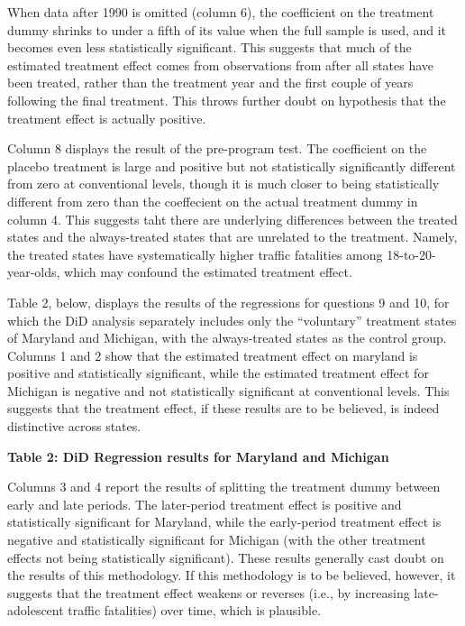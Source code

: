 \documentclass{article}
\begin{document}
When data after 1990 is omitted (column 6), the coefficient on the treatment dummy shrinks to under a fifth of its value when the full sample is used, and it becomes even less statistically significant. This suggests that much of the estimated treatment effect comes from observations from after all states have been treated, rather than the treatment year and the first couple of years following the final treatment. This throws further doubt on hypothesis that the treatment effect is actually positive. 

Column 8 displays the result of the pre-program test. The coefficient on the placebo treatment is large and positive but not statistically significantly different from zero at conventional levels, though it is much closer to being statistically different from zero than the coeffecient on the actual treatment dummy in column 4. This suggests taht there are underlying differences between the treated states and the always-treated states that are unrelated to the treatment. Namely, the treated states have systematically higher traffic fatalities among 18-to-20-year-olds, which may confound the estimated treatment effect. 

Table 2, below, displays the results of the regressions for questions 9 and 10, for which the DiD analysis separately includes only the ``voluntary'' treatment states of Maryland and Michigan, with the always-treated states as the control group. Columns 1 and 2 show that the estimated treatment effect on maryland is positive and statistically significant, while the estimated treatment effect for Michigan is negative and not statistically significant at conventional levels. This suggests that the treatment effect, if these results are to be believed, is indeed distinctive across states.

\pagebreak
\begin{center}
        \textbf{Table 2: DiD Regression results for Maryland and Michigan}
        
\end{center}
\noindent Columns 3 and 4 report the results of splitting the treatment dummy between early and late periods. The later-period treatment effect is positive and statistically significant for Maryland, while the early-period treatment effect is negative and statistically significant for Michigan (with the other treatment effects not being statistically significant). These results generally cast doubt on the results of this methodology. If this methodology is to be believed, however, it suggests that the treatment effect weakens or reverses (i.e., by increasing late-adolescent traffic fatalities) over time, which is plausible.
\end{document}
